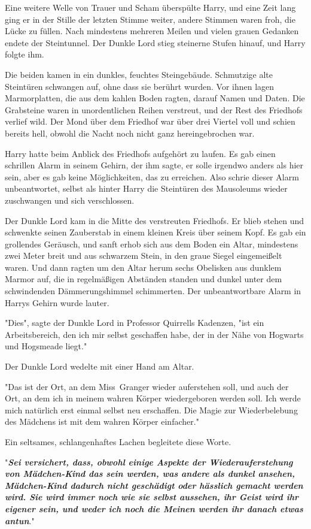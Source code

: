 {Eine weitere Welle von Trauer und Scham überspülte Harry, und eine Zeit lang ging er in der Stille der letzten Stimme weiter, andere Stimmen waren froh, die Lücke zu füllen. Nach mindestens mehreren Meilen und vielen grauen Gedanken endete der Steintunnel. Der Dunkle Lord stieg steinerne Stufen hinauf, und Harry folgte ihm.

Die beiden kamen in ein dunkles, feuchtes Steingebäude. Schmutzige alte Steintüren schwangen auf, ohne dass sie berührt wurden. Vor ihnen lagen Marmorplatten, die aus dem kahlen Boden ragten, darauf Namen und Daten. Die Grabsteine waren in unordentlichen Reihen verstreut, und der Rest des Friedhofs verlief wild. Der Mond über dem Friedhof war über drei Viertel voll und schien bereits hell, obwohl die Nacht noch nicht ganz hereingebrochen war.

Harry hatte beim Anblick des Friedhofs aufgehört zu laufen. Es gab einen schrillen Alarm in seinem Gehirn, der ihm sagte, er solle irgendwo anders als hier sein, aber es gab keine Möglichkeiten, das zu erreichen. Also schrie dieser Alarm unbeantwortet, selbst als hinter Harry die Steintüren des Mausoleums wieder zuschwangen und sich verschlossen.

Der Dunkle Lord kam in die Mitte des verstreuten Friedhofs. Er blieb stehen und schwenkte seinen Zauberstab in einem kleinen Kreis über seinem Kopf. Es gab ein grollendes Geräusch, und sanft erhob sich aus dem Boden ein Altar, mindestens zwei Meter breit und aus schwarzem Stein, in den graue Siegel eingemeißelt waren. Und dann ragten um den Altar herum sechs Obelisken aus dunklem Marmor auf, die in regelmäßigen Abständen standen und dunkel unter dem schwindenden Dämmerungshimmel schimmerten. Der unbeantwortbare Alarm in Harrys Gehirn wurde lauter.

"Dies", sagte der Dunkle Lord in Professor Quirrells Kadenzen, "ist ein Arbeitsbereich, den ich mir selbst geschaffen habe, der in der Nähe von Hogwarts und Hogsmeade liegt."

Der Dunkle Lord wedelte mit einer Hand am Altar.

"Das ist der Ort, an dem Miss~Granger wieder auferstehen soll, und auch der Ort, an dem ich in meinem wahren Körper wiedergeboren werden soll. Ich werde mich natürlich erst einmal selbst neu erschaffen. Die Magie zur Wiederbelebung des Mädchens ist mit dem wahren Körper einfacher."

Ein seltsames, schlangenhaftes Lachen begleitete diese Worte.

"\textbf{\emph{Sei versichert, dass, obwohl einige Aspekte der Wiederauferstehung von Mädchen-Kind das sein werden, was andere als dunkel ansehen, Mädchen-Kind dadurch nicht geschädigt oder hässlich gemacht werden wird. Sie wird immer noch wie sie selbst aussehen, ihr Geist wird ihr eigener sein, und weder ich noch die Meinen werden ihr danach etwas antun}}."

}
